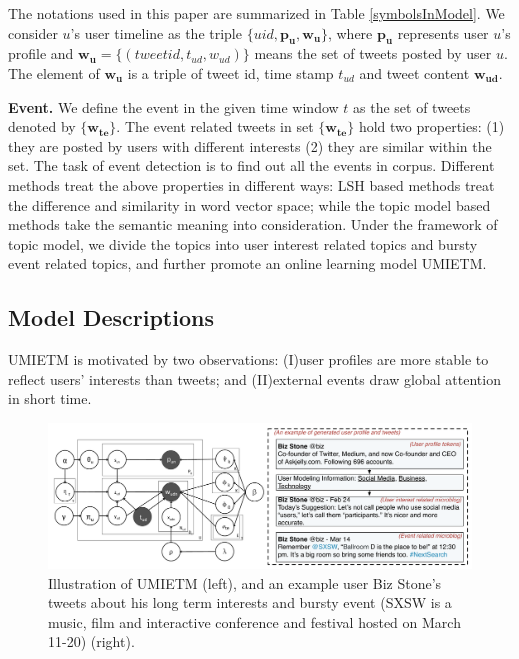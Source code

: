\documentclass[runningheads,a4paper]{llncs}
\begin{document}
The notations used in this paper are summarized in Table \ref{symbolsInModel}.
We consider \(u\)'s user timeline as  the triple \(\{uid, \bm{p_u},\bm{w_u}\} \), where \(\bm{p_u}\) represents user \(u\)'s profile and \(\bm{w_u}=\{(tweetid, t_{ud},w_{ud})\}\) means the set of tweets posted by user \(u\).
The element of \(\bm{w_u}\) is a triple of tweet id, time stamp \(t_{ud}\) and tweet content \(\bm{w_{ud}}\).



\textbf{Event.} We define the event in the given time window \(t\) as the set of tweets denoted by \( \{ \bm{w_{te}}\}\).
The event related tweets in set \( \{ \bm{w_{te}}\}\)  hold two properties: (1) they are posted by users with different interests (2) they are similar within the set.
The task of event detection is to find out all the events in corpus.
Different methods treat the above properties in different ways: LSH based methods\cite{petrovic2010streaming} treat the difference and similarity in word vector space; while the topic model based methods\cite{timeUserLDA2012finding} take the semantic meaning into consideration.
Under the framework of topic model, we divide the topics into user interest related topics and bursty event related topics, and further promote an online learning model UMIETM.

\subsection{Model Descriptions}
\label{subsec:model}
UMIETM is motivated by two observations: (I)user profiles are more stable to reflect users' interests than tweets; and (II)external events draw global attention in short time.
\begin{figure}
    \includegraphics[width=1.0\textwidth]{img/model.pdf}
    \caption{Illustration of UMIETM (left), and an example user Biz Stone's tweets about his long term interests and  bursty event (SXSW is a music, film and interactive conference and festival hosted on March 11-20) (right).} 
    \label{fig:modelUMIETM}
\end{figure}
\end{document}
